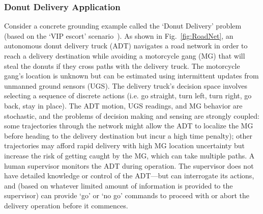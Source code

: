 \subsubsection{Donut Delivery Application} \label{sec:donut_delivery}
Consider a concrete grounding example called the `Donut Delivery' problem (based on the `VIP escort' scenario~\cite{Humphrey2012-lr}). As shown in Fig.~\ref{fig:RoadNet}, an autonomous donut delivery truck (ADT) navigates a road network in order to reach a delivery destination while avoiding a motorcycle gang (MG) that will steal the donuts if they cross paths with the delivery truck. The motorcycle gang's location is unknown but can be estimated using intermittent updates from unmanned ground sensors (UGS). The delivery truck's decision space involves selecting a sequence of discrete actions (i.e. go straight, turn left, turn right, go back, stay in place). The ADT motion, UGS readings, and MG behavior are stochastic, and the problems of decision making and sensing are strongly coupled: some trajectories through the network might allow the ADT to localize the MG before heading to the delivery destination but incur a high time penalty); other trajectories may afford rapid delivery with high MG location uncertainty but increase the risk of getting caught by the MG, which can take multiple paths. A human supervisor monitors the ADT during operation. The supervisor does not have detailed knowledge or control of the ADT---but can interrogate its actions, and (based on whatever limited amount of information is provided to the supervisor) can provide `go' or `no go' commands to proceed with or abort the delivery operation before it commences. 

